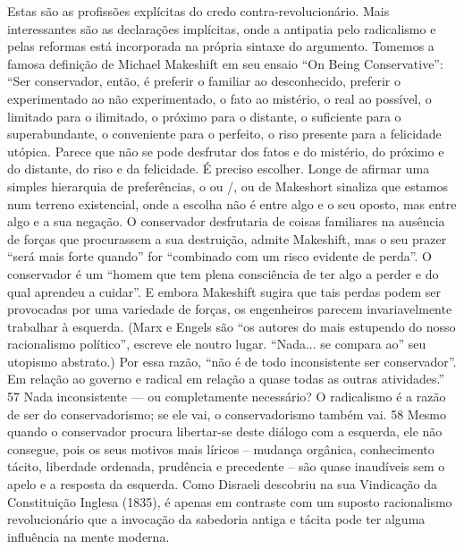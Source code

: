 Estas são as profissões explícitas do credo contra-revolucionário. Mais interessantes são as declarações implícitas, onde a antipatia pelo radicalismo e pelas reformas está incorporada na própria sintaxe do argumento. Tomemos a famosa definição de Michael Makeshift em seu ensaio “On Being Conservative”: “Ser conservador, então, é preferir o familiar ao desconhecido, preferir o experimentado ao não experimentado, o fato ao mistério, o real ao possível, o limitado para o ilimitado, o próximo para o distante, o suficiente para o superabundante, o conveniente para o perfeito, o riso presente para a felicidade utópica. Parece que não se pode desfrutar dos fatos e do mistério, do próximo e do distante, do riso e da felicidade. É preciso escolher. Longe de afirmar uma simples hierarquia de preferências, o ou /, ou de Makeshort sinaliza que estamos num terreno existencial, onde a escolha não é entre algo e o seu oposto, mas entre algo e a sua negação. O conservador desfrutaria de coisas familiares na ausência de forças que procurassem a sua destruição, admite Makeshift, mas o seu prazer “será mais forte quando” for “combinado com um risco evidente de perda”. O conservador é um “homem que tem plena consciência de ter algo a perder e do qual aprendeu a cuidar”. E embora Makeshift sugira que tais perdas podem ser provocadas por uma variedade de forças, os engenheiros parecem invariavelmente trabalhar à esquerda. (Marx e Engels são “os autores do mais estupendo do nosso racionalismo político”, escreve ele noutro lugar. “Nada... se compara ao” seu utopismo abstrato.) Por essa razão, “não é de todo inconsistente ser conservador”. Em relação ao governo e radical em relação a quase todas as outras atividades.”
 {\color{blue} 57}  
Nada inconsistente — ou completamente necessário? O radicalismo é a razão de ser do conservadorismo; se ele vai, o conservadorismo também vai.
 {\color{blue} 58}  
Mesmo quando o conservador procura libertar-se deste diálogo com a esquerda, ele não consegue, pois os seus motivos mais líricos – mudança orgânica, conhecimento tácito, liberdade ordenada, prudência e precedente – são quase inaudíveis sem o apelo e a resposta da esquerda. Como Disraeli descobriu na sua Vindicação da Constituição Inglesa (1835), é apenas em contraste com um suposto racionalismo revolucionário que a invocação da sabedoria antiga e tácita pode ter alguma influência na mente moderna.
 
\par
 

